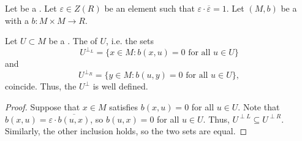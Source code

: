 \begin{lemma} \label{lemma:orthogonal_complement_of_a_submodule_of_a_module_with_a_varepsilon_hermitian_form_over_a_ring_with_involution_can_be_defined_either_using_the_left_or_right_side_of_the_form}
    Let  be a . Let $\varepsilon \in Z(R)$ be an element such that $\varepsilon \cdot \overline{\varepsilon} = 1$. Let $(M,b)$ be a  with a  $b: M \times M \to R$.

    Let $U \subset M$ be a . 
    The  of $U$, i.e. the sets 
    $$U^{\perp_L} = \{x \in M : b(x,u) = 0 \text{ for all } u \in U \}$$
    and 
    $$U^{\perp_R} = \{y \in M : b(u,y) = 0 \text{ for all } u \in U\},$$
    coincide. Thus, the  $U^\perp$ is well defined.
\end{lemma}
\begin{proof}
    Suppose that $x \in M$ satisfies $b(x,u) = 0$ for all $u \in U$. Note that $b(x,u) = \varepsilon \cdot \overline{b(u,x)}$, so $b(u,x) = 0$ for all $u \in U$. Thus, $U^{\perp L} \subseteq U^{\perp R}$. Similarly, the other inclusion holds, so the two sets are equal.
\end{proof}